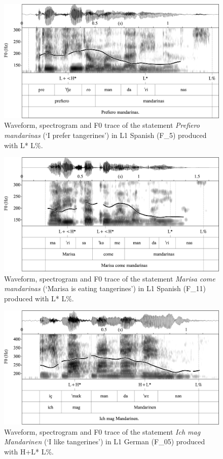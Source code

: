 \begin{figure}[p]
\includegraphics[width=\textwidth]{figures/Figure_4.3.png}
\caption{Waveform, spectrogram and F0 trace of the statement \textit{Prefiero mandarinas} (‘I prefer tangerines’) in L1 Spanish \mbox{(F\_5)} produced with L* L\%.}
\label{fig:4.3}
\end{figure}

\begin{figure}[p]
\includegraphics[width=\textwidth]{figures/Figure_4.4.png}
\caption{Waveform, spectrogram and F0 trace of the statement \textit{Marisa come mandarinas} (‘Marisa is eating tangerines’) in L1 Spanish \mbox{(F\_11)} produced with L* L\%.}
\label{fig:4.4}
\end{figure}

\begin{figure}
\includegraphics[width=\textwidth]{figures/Figure_4.5.png}
\caption{Waveform, spectrogram and F0 trace of the statement \textit{Ich mag Mandarinen} (‘I like tangerines’) in L1 German \mbox{(F\_05)} produced with H+L* L\%.}
\label{fig:4.5}
\end{figure}


